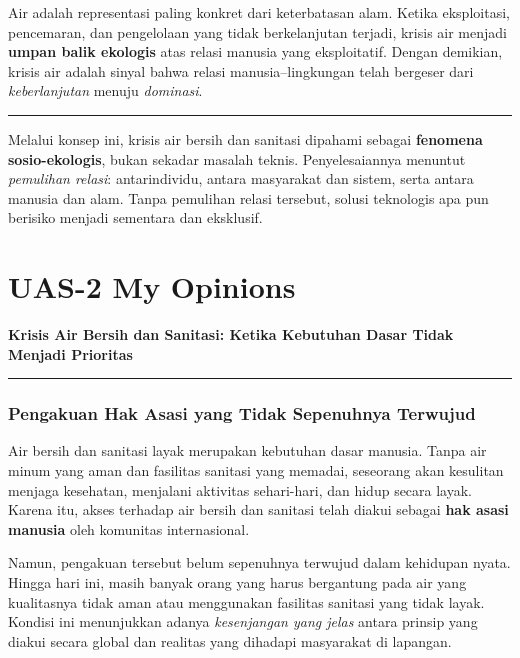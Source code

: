 \documentclass[
  letterpaper,
  DIV=11,
  numbers=noendperiod]{scrreprt}
\begin{document}
Air adalah representasi paling konkret dari keterbatasan alam. Ketika
eksploitasi, pencemaran, dan pengelolaan yang tidak berkelanjutan
terjadi, krisis air menjadi \textbf{umpan balik ekologis} atas relasi
manusia yang eksploitatif. Dengan demikian, krisis air adalah sinyal
bahwa relasi manusia--lingkungan telah bergeser dari
\emph{keberlanjutan} menuju \emph{dominasi}.

\begin{center}\rule{0.5\linewidth}{0.5pt}\end{center}

Melalui konsep ini, krisis air bersih dan sanitasi dipahami sebagai
\textbf{fenomena sosio-ekologis}, bukan sekadar masalah teknis.
Penyelesaiannya menuntut \emph{pemulihan relasi}: antarindividu, antara
masyarakat dan sistem, serta antara manusia dan alam. Tanpa pemulihan
relasi tersebut, solusi teknologis apa pun berisiko menjadi sementara
dan eksklusif.


\chapter{UAS-2 My Opinions}\label{uas-2-my-opinions}

\textbf{Krisis Air Bersih dan Sanitasi: Ketika Kebutuhan Dasar Tidak
Menjadi Prioritas}

\begin{center}\rule{0.5\linewidth}{0.5pt}\end{center}

\subsection{Pengakuan Hak Asasi yang Tidak Sepenuhnya
Terwujud}\label{pengakuan-hak-asasi-yang-tidak-sepenuhnya-terwujud}

Air bersih dan sanitasi layak merupakan kebutuhan dasar manusia. Tanpa
air minum yang aman dan fasilitas sanitasi yang memadai, seseorang akan
kesulitan menjaga kesehatan, menjalani aktivitas sehari-hari, dan hidup
secara layak. Karena itu, akses terhadap air bersih dan sanitasi telah
diakui sebagai \textbf{hak asasi manusia} oleh komunitas internasional.

Namun, pengakuan tersebut belum sepenuhnya terwujud dalam kehidupan
nyata. Hingga hari ini, masih banyak orang yang harus bergantung pada
air yang kualitasnya tidak aman atau menggunakan fasilitas sanitasi yang
tidak layak. Kondisi ini menunjukkan adanya \emph{kesenjangan yang
jelas} antara prinsip yang diakui secara global dan realitas yang
dihadapi masyarakat di lapangan.
\end{document}

